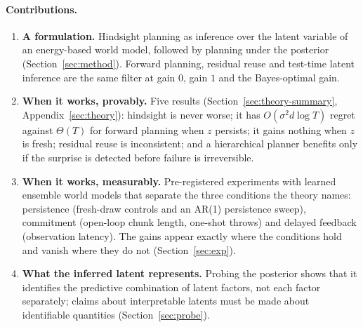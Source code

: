 \documentclass[11pt]{article}
\begin{document}
\paragraph{Contributions.}
\begin{enumerate}
\item \textbf{A formulation.} Hindsight planning as inference over the latent variable of an energy-based world model,
followed by planning under the posterior (Section~\ref{sec:method}). Forward planning, residual reuse
\citep{cwm_2611_24778} and test-time latent inference \citep{t2z_2610_22364} are the same filter at gain $0$, gain $1$ and
the Bayes-optimal gain.
\item \textbf{When it works, provably.} Five results (Section~\ref{sec:theory-summary}, Appendix~\ref{sec:theory}):
hindsight is never worse; it has $O(\sigma^2 d\log T)$ regret against $\Theta(T)$ for forward planning when $z$ persists;
it gains nothing when $z$ is fresh; residual reuse is inconsistent; and a hierarchical planner benefits only if the
surprise is detected before failure is irreversible.
\item \textbf{When it works, measurably.} Pre-registered experiments with learned ensemble world models that separate the
three conditions the theory names: persistence (fresh-draw controls and an AR(1) persistence sweep), commitment
(open-loop chunk length, one-shot throws) and delayed feedback (observation latency). The gains appear exactly where
the conditions hold and vanish where they do not (Section~\ref{sec:exp}).
\item \textbf{What the inferred latent represents.} Probing the posterior shows that it identifies the predictive
combination of latent factors, not each factor separately; claims about interpretable latents must be made about
identifiable quantities (Section~\ref{sec:probe}).
\end{enumerate}
\end{document}
